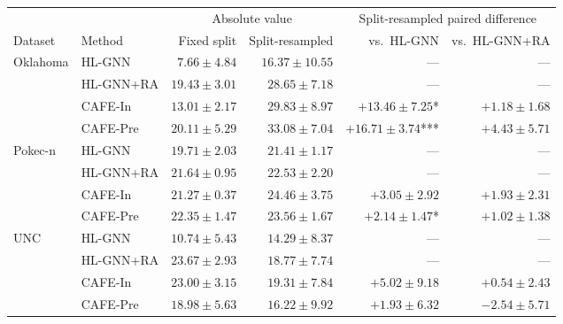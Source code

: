 \begin{tabular}{llrrrr}
\toprule
 & & \multicolumn{2}{c}{Absolute value} & \multicolumn{2}{c}{Split-resampled paired difference} \\
\cmidrule(lr){3-4}\cmidrule(lr){5-6}
Dataset & Method & Fixed split & Split-resampled & vs.\ HL-GNN & vs.\ HL-GNN+RA \\
\midrule
Oklahoma & HL-GNN & $7.66 \pm 4.84$ & $16.37 \pm 10.55$ & --- & --- \\
 & HL-GNN+RA & $19.43 \pm 3.01$ & $28.65 \pm 7.18$ & --- & --- \\
 & CAFE-In & $13.01 \pm 2.17$ & $29.83 \pm 8.97$ & $+13.46 \pm 7.25$* & $+1.18 \pm 1.68$ \\
 & CAFE-Pre & $20.11 \pm 5.29$ & $33.08 \pm 7.04$ & $+16.71 \pm 3.74$*** & $+4.43 \pm 5.71$ \\
\addlinespace[2pt]
Pokec-n & HL-GNN & $19.71 \pm 2.03$ & $21.41 \pm 1.17$ & --- & --- \\
 & HL-GNN+RA & $21.64 \pm 0.95$ & $22.53 \pm 2.20$ & --- & --- \\
 & CAFE-In & $21.27 \pm 0.37$ & $24.46 \pm 3.75$ & $+3.05 \pm 2.92$ & $+1.93 \pm 2.31$ \\
 & CAFE-Pre & $22.35 \pm 1.47$ & $23.56 \pm 1.67$ & $+2.14 \pm 1.47$* & $+1.02 \pm 1.38$ \\
\addlinespace[2pt]
UNC & HL-GNN & $10.74 \pm 5.43$ & $14.29 \pm 8.37$ & --- & --- \\
 & HL-GNN+RA & $23.67 \pm 2.93$ & $18.77 \pm 7.74$ & --- & --- \\
 & CAFE-In & $23.00 \pm 3.15$ & $19.31 \pm 7.84$ & $+5.02 \pm 9.18$ & $+0.54 \pm 2.43$ \\
 & CAFE-Pre & $18.98 \pm 5.63$ & $16.22 \pm 9.92$ & $+1.93 \pm 6.32$ & $-2.54 \pm 5.71$ \\
\bottomrule
\end{tabular}

